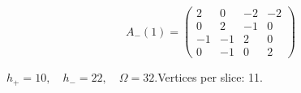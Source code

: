 \begin{minipage}{\linewidth}
\begin{minipage}[c]{0.495\linewidth}
\end{minipage}%
\begin{minipage}[c]{0.495\linewidth}\centering\fontsize{9.7}{12}\selectfont
\setlength{\abovedisplayskip}{4pt}\setlength{\belowdisplayskip}{4pt}
\setlength{\abovedisplayshortskip}{4pt}\setlength{\belowdisplayshortskip}{4pt}
\setlength{\arraycolsep}{3pt}\renewcommand{\arraystretch}{1.08}
\[A_{-}(1)=\begin{pmatrix}2 & 0 & -2 & -2\\0 & 2 & -1 & 0\\-1 & -1 & 2 & 0\\0 & -1 & 0 & 2\end{pmatrix}\]
\end{minipage}%
\par\smallskip\noindent\small $h_+=10,\quad h_-=22,\quad \Omega=32.$\quad Vertices per slice: 11.
\end{minipage}\par\vfill
